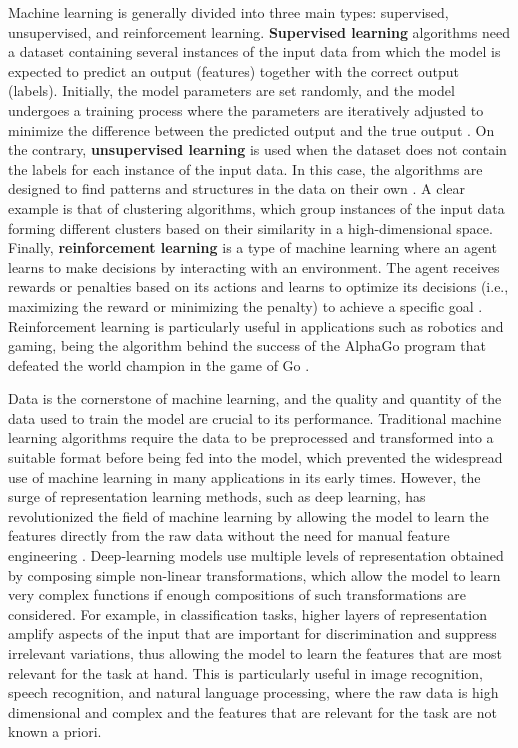 Machine learning is generally divided into three main types: supervised,
unsupervised, and reinforcement learning. \textbf{Supervised learning}
algorithms need a dataset containing several instances of the input data from
which the model is expected to predict an output (features) together with the
correct output (labels). Initially, the model parameters are set randomly, and
the model undergoes a training process where the parameters are iteratively
adjusted to minimize the difference between the predicted output and the true
output \cite{Nielsen2015}. On the contrary, \textbf{unsupervised learning} is
used when the dataset does not contain the labels for each instance of the
input data. In this case, the algorithms are designed to find patterns and
structures in the data on their own \cite{Duda2006}. A clear example is that
of clustering algorithms, which group instances of the input data forming
different clusters based on their similarity in a high-dimensional space.
Finally, \textbf{reinforcement learning} is a type of machine learning where
an agent learns to make decisions by interacting with an environment. The agent
receives rewards or penalties based on its actions and learns to optimize its
decisions (i.e., maximizing the reward or minimizing the penalty) to achieve a
specific goal \cite{Sutton2018}. Reinforcement learning is particularly
useful in applications such as robotics and gaming, being the algorithm behind
the success of the AlphaGo program that defeated the world champion in the game
of Go \cite{Silver2017}.

Data is the cornerstone of machine learning, and the quality and quantity of
the data used to train the model are crucial to its performance. Traditional
machine learning algorithms require the data to be preprocessed and
transformed into a suitable format before being fed into the model, which
prevented the widespread use of machine learning in many applications in its
early times. However, the surge of representation learning methods, such as
deep learning, has revolutionized the field of machine learning by allowing
the model to learn the features directly from the raw data without the need for
manual feature engineering \cite{LeCun2015}. Deep-learning models use
multiple levels of representation obtained by composing simple non-linear
transformations, which allow the model to learn very complex functions if
enough compositions of such transformations are considered. For example, in
classification tasks, higher layers of representation amplify aspects of the
input that are important for discrimination and suppress irrelevant
variations, thus allowing the model to learn the features that are most
relevant for the task at hand. This is particularly useful in image
recognition, speech recognition, and natural language processing, where the raw
data is high dimensional and complex and the features that are relevant for
the task are not known a priori.

